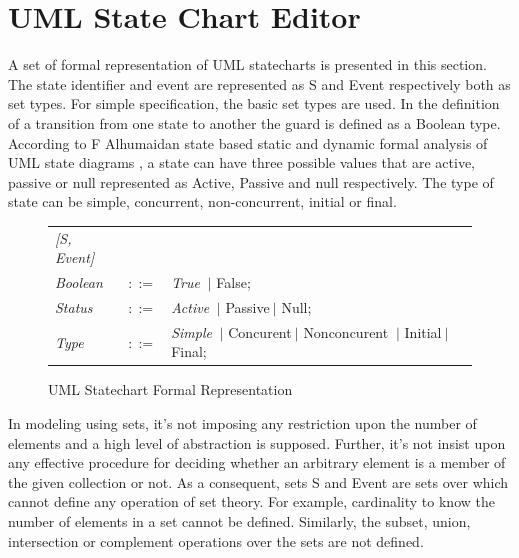 \section{UML State Chart Editor}

A set of formal representation of UML statecharts is presented in this section. The state identifier and event are represented as S and Event respectively both as set types. For simple specification, the basic set types are used. In the definition of a transition from one state to another the guard is defined as a Boolean type. According to F Alhumaidan state based static and dynamic formal analysis of UML state diagrams \cite{ref_16_alhumaidan2012state} , a state can have three possible values that are active, passive or null represented as Active, Passive and null respectively. The type of state can be simple, concurrent, non-concurrent, initial or final.

\begin{figure}[ht!]
	\centering
	\begin{tabular}{lll}
		\footnotesize                       
		\textit{[S, Event]}          &\footnotesize \\
		
		\footnotesize
		\textit{Boolean}            &\footnotesize $::=$         &\footnotesize \textit{True} $\ \vert $ {False};       \\   
		\footnotesize
		\textit{Status}            &\footnotesize $::=$         &\footnotesize \textit{Active}
		 $\ \vert $ {Passive}$\ \vert $ {Null};       \\ 
		\footnotesize
		\textit{Type}            &\footnotesize $::=$         &\footnotesize \textit{Simple}
		 	$\ \vert $ {Concurent}$\ \vert $ {Nonconcurent} $\ \vert $ {Initial}$\ \vert $ {Final};       \\
		 	 
		
	\end{tabular}
	\caption{UML Statechart Formal Representation}
	\label{statechart_formal_representation}
\end{figure}
In modeling using sets, it's not imposing any restriction upon the number of elements and a high level of
abstraction is supposed. Further, it's not insist upon any
effective procedure for deciding whether an arbitrary
element is a member of the given collection or not. As a
consequent, sets S and Event are sets over which cannot define any operation of set theory. For example,
cardinality to know the number of elements in a set cannot
be defined. Similarly, the subset, union, intersection or
complement operations over the sets are not defined.\\

